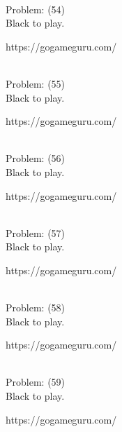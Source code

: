 \documentclass[11pt]{article}
\begin{document}
\begin{minipage}[t]{0.5\textwidth}
  {\centering
  
\\
Problem: (54)\\
Black to play.

https://gogameguru.com/\\
  }
\end{minipage}
\begin{minipage}[t]{0.5\textwidth}
  {\centering
  
\\
Problem: (55)\\
Black to play.

https://gogameguru.com/\\
  }
\end{minipage}
\begin{minipage}[t]{0.5\textwidth}
  {\centering
  
\\
Problem: (56)\\
Black to play.

https://gogameguru.com/\\
  }
\end{minipage}
\begin{minipage}[t]{0.5\textwidth}
  {\centering
  
\\
Problem: (57)\\
Black to play.

https://gogameguru.com/\\
  }
\end{minipage}
\begin{minipage}[t]{0.5\textwidth}
  {\centering
  
\\
Problem: (58)\\
Black to play.

https://gogameguru.com/\\
  }
\end{minipage}
\begin{minipage}[t]{0.5\textwidth}
  {\centering
  
\\
Problem: (59)\\
Black to play.

https://gogameguru.com/\\
  }
\end{minipage}
\end{document}
